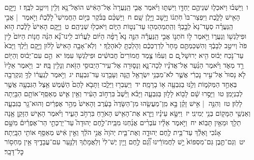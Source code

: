\documentclass[18pt]{article}
\newcommand{\vart}[1]{\Bfootnote{#1}}	%
\begin{document}
 {\loc ו~}וַיֵּשְׁב֗וּ וַיֹּאכְל֧וּ שְׁנֵיהֶ֛ם יַחְדָּ֖ו וַיִּשְׁתּ֑וּ וַיֹּ֜אמֶר אֲבִ֤י הַֽנַּעֲרָה֙ אֶל־הָאִ֔ישׁ הוֹאֶל־נָ֥א וְלִ֖ין וְיִיטַ֥ב לִבֶּֽךָ׃ \startlock
 {\loc ז~}וַיָּ֥קׇם הָאִ֖ישׁ לָלֶ֑כֶת וַיִּפְצַר־בּוֹ֙ חֹֽתְנ֔וֹ וַיָּ֖שׇׁב וַיָּ֥לֶן שָֽׁם׃ \startlock
 {\loc ח~}וַיַּשְׁכֵּ֨ם בַּבֹּ֜קֶר בַּיּ֣וֹם הַחֲמִישִׁי֮ לָלֶ֒כֶת֒ וַיֹּ֣אמֶר  |  אֲבִ֣י הַֽנַּעֲרָ֗ה סְעׇד־נָא֙ לְבָ֣בְךָ֔ וְהִֽתְמַהְמְה֖וּ עַד־נְט֣וֹת הַיּ֑וֹם וַיֹּאכְל֖וּ שְׁנֵיהֶֽם׃ \startlock
 {\loc ט~}וַיָּ֤קׇם הָאִישׁ֙ לָלֶ֔כֶת ה֥וּא וּפִילַגְשׁ֖וֹ וְנַעֲר֑וֹ וַיֹּ֣אמֶר ל֣וֹ חֹתְנ֣וֹ אֲבִ֣י הַֽנַּעֲרָ֡ה הִנֵּ֣ה נָא֩ רָפָ֨ה הַיּ֜וֹם לַעֲר֗וֹב לִֽינוּ־נָ֞א הִנֵּ֨ה חֲנ֤וֹת הַיּוֹם֙ לִ֥ין פֹּה֙ וְיִיטַ֣ב לְבָבֶ֔ךָ וְהִשְׁכַּמְתֶּ֤ם מָחָר֙ לְדַרְכְּכֶ֔ם וְהָלַכְתָּ֖ לְאֹהָלֶֽךָ׃ \startlock
 {\loc י~}וְלֹֽא־אָבָ֤ה הָאִישׁ֙ לָל֔וּן וַיָּ֣קׇם וַיֵּ֗לֶךְ וַיָּבֹא֙ עַד־נֹ֣כַח יְב֔וּס הִ֖יא יְרוּשָׁל ָ֑͏ְם ם וְעִמּ֗וֹ צֶ֤מֶד חֲמוֹרִים֙ חֲבוּשִׁ֔ים וּפִילַגְשׁ֖וֹ עִמּֽוֹ׃ \startlock
 {\loc יא~}הֵ֣ם עִם־יְב֔וּס וְהַיּ֖וֹם רַ֣ד מְאֹ֑ד וַיֹּ֨אמֶר הַנַּ֜עַר אֶל־אֲדֹנָ֗יו לְכָה־נָּ֛א וְנָס֛וּרָה אֶל־עִֽיר־הַיְבוּסִ֥י הַזֹּ֖את וְנָלִ֥ין בָּֽהּ׃ \startlock
 {\loc יב~}וַיֹּ֤אמֶר אֵלָיו֙  \edtext{אֲדֹנָ֔יו}{\vart{=א | מג"ה=אֲדֹנָיו בלי טעם (תקלדה) | }}  לֹ֤א נָסוּר֙ אֶל־עִ֣יר נׇכְרִ֔י אֲשֶׁ֛ר לֹא־מִבְּנֵ֥י יִשְׂרָאֵ֖ל הֵ֑נָּה וְעָבַ֖רְנוּ עַד־גִּבְעָֽה׃ \startlock
 {\loc יג~}וַיֹּ֣אמֶר לְנַֽעֲר֔וֹ לְךָ֥ וְנִקְרְבָ֖ה בְּאַחַ֣ד הַמְּקֹמ֑וֹת וְלַ֥נּוּ בַגִּבְעָ֖ה א֥וֹ בָרָמָֽה׃ \startlock
 {\loc יד~}וַיַּעַבְר֖וּ וַיֵּלֵ֑כוּ וַתָּבֹ֤א לָהֶם֙ הַשֶּׁ֔מֶשׁ אֵ֥צֶל הַגִּבְעָ֖ה אֲשֶׁ֥ר לְבִנְיָמִֽן׃ \startlock
 {\loc טו~}וַיָּסֻ֣רוּ שָׁ֔ם לָב֖וֹא לָל֣וּן בַּגִּבְעָ֑ה וַיָּבֹ֗א וַיֵּ֙שֶׁב֙ בִּרְח֣וֹב הָעִ֔יר וְאֵ֥ין אִ֛ישׁ מְאַסֵּֽף־אוֹתָ֥ם הַבַּ֖יְתָה לָלֽוּן׃ \startlock
 {\loc טז~}וְהִנֵּ֣ה  |  אִ֣ישׁ זָקֵ֗ן בָּ֣א מִֽן־מַעֲשֵׂ֤הוּ מִן־הַשָּׂדֶה֙ בָּעֶ֔רֶב וְהָאִישׁ֙ מֵהַ֣ר אֶפְרַ֔יִם וְהוּא־גָ֖ר בַּגִּבְעָ֑ה וְאַנְשֵׁ֥י הַמָּק֖וֹם בְּנֵ֥י יְמִינִֽי׃ \startlock
 {\loc יז~}וַיִּשָּׂ֣א עֵינָ֗יו וַיַּ֛רְא אֶת־הָאִ֥ישׁ הָאֹרֵ֖חַ בִּרְחֹ֣ב הָעִ֑יר וַיֹּ֨אמֶר הָאִ֧ישׁ הַזָּקֵ֛ן אָ֥נָה תֵלֵ֖ךְ וּמֵאַ֥יִן תָּבֽוֹא׃ \startlock
 {\loc יח~}וַיֹּ֣אמֶר אֵלָ֗יו עֹבְרִ֨ים אֲנַ֜חְנוּ מִבֵּֽית־לֶ֣חֶם יְהוּדָה֮ עַד־יַרְכְּתֵ֣י הַר־אֶפְרַ֒יִם֒ מִשָּׁ֣ם אָנֹ֔כִי וָאֵלֵ֕ךְ עַד־בֵּ֥ית לֶ֖חֶם יְהוּדָ֑ה וְאֶת־בֵּ֤ית יְהֹוָה֙ אֲנִ֣י הֹלֵ֔ךְ וְאֵ֣ין אִ֔ישׁ מְאַסֵּ֥ף אוֹתִ֖י הַבָּֽיְתָה׃ \startlock
 {\loc יט~}וְגַם־תֶּ֤בֶן גַּם־מִסְפּוֹא֙ יֵ֣שׁ לַחֲמוֹרֵ֔ינוּ וְ֠גַ֠ם לֶ֣חֶם וָיַ֤יִן יֶשׁ־לִי֙ וְלַאֲמָתֶ֔ךָ וְלַנַּ֖עַר עִם־עֲבָדֶ֑יךָ אֵ֥ין מַחְס֖וֹר כׇּל־דָּבָֽר׃ \startlock
\end{document}
